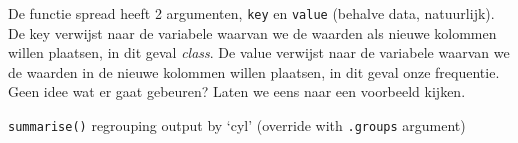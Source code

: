 \documentclass[]{tufte-book}
\newenvironment{Shaded}{}{}
\newcommand{\DataTypeTok}[1]{\textcolor[rgb]{0.56,0.13,0.00}{#1}}
\newcommand{\KeywordTok}[1]{\textcolor[rgb]{0.00,0.44,0.13}{\textbf{#1}}}
\newcommand{\NormalTok}[1]{#1}
\newcommand{\OperatorTok}[1]{\textcolor[rgb]{0.40,0.40,0.40}{#1}}
\newcommand{\StringTok}[1]{\textcolor[rgb]{0.25,0.44,0.63}{#1}}
\begin{document}
De functie spread heeft 2 argumenten, \texttt{key} en \texttt{value} (behalve data, natuurlijk). De key verwijst naar de variabele waarvan we de waarden als nieuwe kolommen willen plaatsen, in dit geval \emph{class}. De value verwijst naar de variabele waarvan we de waarden in de nieuwe kolommen willen plaatsen, in dit geval onze frequentie. Geen idee wat er gaat gebeuren? Laten we eens naar een voorbeeld kijken.

\begin{Shaded}
\end{Shaded}

\texttt{summarise()} regrouping output by `cyl' (override with \texttt{.groups} argument)
\end{document}
